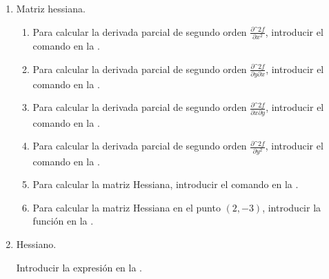 \begin{enumerate}[leftmargin=*]
\begin{enumerate}
      \item Matriz hessiana.
            \begin{indication}
            \begin{enumerate}
            \item Para calcular la derivada parcial de segundo orden $\frac{\partial\^2 f}{\partial x^2}$, introducir el comando  en la .
            \item Para calcular la derivada parcial de segundo orden $\frac{\partial\^2 f}{\partial y\partial x}$, introducir el comando  en la .
            \item Para calcular la derivada parcial de segundo orden $\frac{\partial\^2 f}{\partial x\partial y}$, introducir el comando  en la .
            \item Para calcular la derivada parcial de segundo orden $\frac{\partial\^2 f}{\partial y^2}$, introducir el comando  en la .
            \item Para calcular la matriz Hessiana, introducir el comando  en la .
            \item Para calcular la matriz Hessiana en el punto $(2,-3)$, introducir la función  en la .
            \end{enumerate}
            \end{indication}

      \item Hessiano.
            \begin{indication}
            Introducir la expresión  en la .
            \end{indication}
      \end{enumerate}



\end{enumerate}
